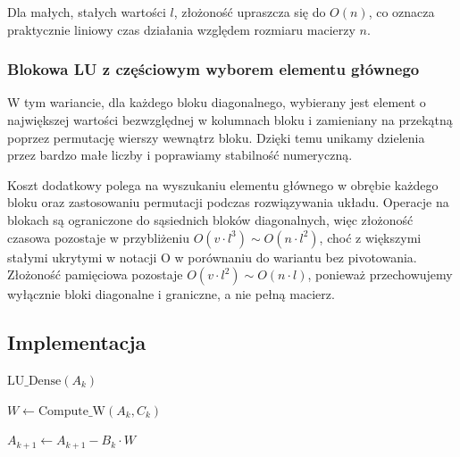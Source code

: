 \documentclass{article}
\begin{document}
Dla małych, stałych wartości \(l\), złożoność upraszcza się do \(O(n)\), co oznacza praktycznie liniowy czas działania względem rozmiaru macierzy \(n\).  

\subsubsection*{Blokowa LU z częściowym wyborem elementu głównego}
W tym wariancie, dla każdego bloku diagonalnego, wybierany jest element
o największej wartości bezwzględnej w kolumnach bloku i zamieniany na
przekątną poprzez permutację wierszy wewnątrz bloku.  
Dzięki temu unikamy dzielenia przez bardzo małe liczby i poprawiamy stabilność
numeryczną.

Koszt dodatkowy polega na wyszukaniu elementu głównego w obrębie każdego
bloku oraz zastosowaniu permutacji podczas rozwiązywania układu. Operacje
na blokach są ograniczone do sąsiednich bloków diagonalnych, więc złożoność
czasowa pozostaje w przybliżeniu \(O(v \cdot l^3) \sim O(n \cdot l^2)\),
choć z większymi stałymi ukrytymi w notacji O w porównaniu do wariantu bez
pivotowania.  
Złożoność pamięciowa pozostaje \(O(v \cdot l^2) \sim O(n \cdot l)\), ponieważ
przechowujemy wyłącznie bloki diagonalne i graniczne, a nie pełną macierz.

\subsection*{Implementacja}
\begin{algorithm}[H]
\caption{Blokowa dekompozycja LU bez wyboru elementu głównego}
\begin{algorithmic}[1]
        \State {}
        \State $\text{LU\_Dense}(A_k)$
        
            \State {}
            \State $W \gets \text{Compute\_W}(A_k, C_k)$
            
            \State {}
            \State $A_{k+1} \gets A_{k+1} - B_k \cdot W$
        \EndIf
    \EndFor
\EndProcedure
\end{algorithmic}
\end{algorithm}
\end{document}
